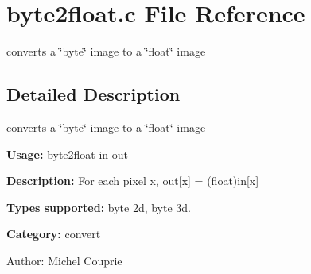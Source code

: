 \section{byte2float.c File Reference}
\label{byte2float_8c}
converts a \char`\"{}byte\char`\"{} image to a \char`\"{}float\char`\"{} image  




\label{_details}
\subsection{Detailed Description}
converts a \char`\"{}byte\char`\"{} image to a \char`\"{}float\char`\"{} image 

{\bf Usage:} byte2float in out

{\bf Description:} For each pixel x, out[x] = (float)in[x]

{\bf Types supported:} byte 2d, byte 3d.

{\bf Category:} convert

\begin{Desc}
\item[Author:]Michel Couprie \end{Desc}
